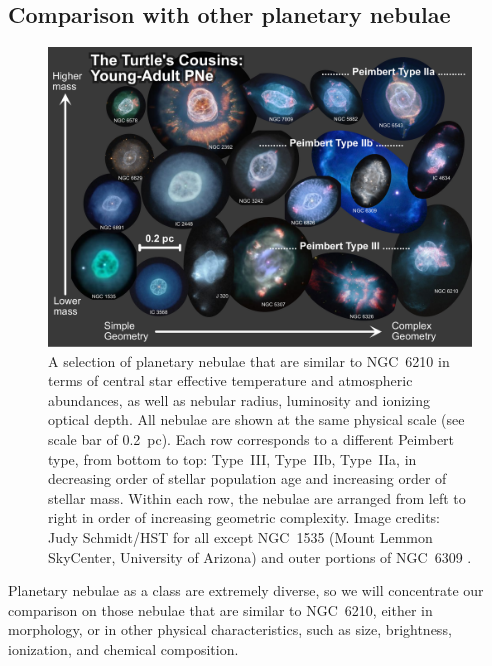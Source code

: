 \documentclass[useAMS, usenatbib]{mnras}
\begin{document}
\subsection{Comparison with other planetary nebulae}
\label{sec:comp-with-other}

\begin{figure}
  \centering
  \includegraphics[width=\linewidth]{figs/cousins-of-the-turtle-lores}
  \caption{
    A selection of planetary nebulae that are similar to NGC~6210
    in terms of central star effective temperature and atmospheric abundances,
    as well as nebular radius, luminosity and ionizing optical depth.
    All nebulae are shown at the same physical scale (see scale bar of \SI{0.2}{pc}).
    Each row corresponds to a different Peimbert type, from bottom to top:
    Type~III, Type~IIb, Type~IIa,
    in decreasing order of stellar population age
    and increasing order of stellar mass.
    Within each row, the nebulae are arranged from left to right
    in order of increasing geometric complexity.
    Image credits: Judy Schmidt/HST for all except
    NGC~1535 (Mount Lemmon SkyCenter, University of Arizona)
    and outer portions of NGC~6309 \citep{Rubio:2015a}.
  }
  \label{fig:cousins}
\end{figure}


Planetary nebulae as a class are extremely diverse,
so we will concentrate our comparison on those nebulae that are similar to NGC~6210,
either in morphology,
or in other physical characteristics, such as size, brightness, ionization,
and chemical composition.
\end{document}
